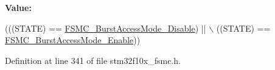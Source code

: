 {\bfseries Value\+:}
\begin{DoxyCode}
(((STATE) == \hyperlink{group___f_s_m_c___burst___access___mode_ga26fc544945415e350563a9b00684850c}{FSMC\_BurstAccessMode\_Disable}) || \(\backslash\)
                                  ((STATE) == \hyperlink{group___f_s_m_c___burst___access___mode_ga841831dfacfdd8889dafe26cc594bf02}{FSMC\_BurstAccessMode\_Enable}))
\end{DoxyCode}


Definition at line 341 of file stm32f10x\+\_\+fsmc.\+h.

